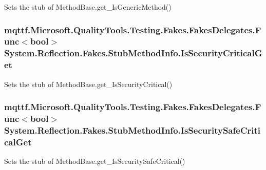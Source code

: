 Sets the stub of Method\-Base.\-get\-\_\-\-Is\-Generic\-Method()

\hypertarget{class_system_1_1_reflection_1_1_fakes_1_1_stub_method_info_ac7db65702f5bef7fe9940bda2afbfaf3}{
\subsubsection[{Is\-Security\-Critical\-Get}]{\setlength{\rightskip}{0pt plus 5cm}mqttf.\-Microsoft.\-Quality\-Tools.\-Testing.\-Fakes.\-Fakes\-Delegates.\-Func$<$bool$>$ System.\-Reflection.\-Fakes.\-Stub\-Method\-Info.\-Is\-Security\-Critical\-Get}}\label{class_system_1_1_reflection_1_1_fakes_1_1_stub_method_info_ac7db65702f5bef7fe9940bda2afbfaf3}


Sets the stub of Method\-Base.\-get\-\_\-\-Is\-Security\-Critical()

\hypertarget{class_system_1_1_reflection_1_1_fakes_1_1_stub_method_info_a46e999acc3f8932f7d95098acc0302fd}{
\subsubsection[{Is\-Security\-Safe\-Critical\-Get}]{\setlength{\rightskip}{0pt plus 5cm}mqttf.\-Microsoft.\-Quality\-Tools.\-Testing.\-Fakes.\-Fakes\-Delegates.\-Func$<$bool$>$ System.\-Reflection.\-Fakes.\-Stub\-Method\-Info.\-Is\-Security\-Safe\-Critical\-Get}}\label{class_system_1_1_reflection_1_1_fakes_1_1_stub_method_info_a46e999acc3f8932f7d95098acc0302fd}


Sets the stub of Method\-Base.\-get\-\_\-\-Is\-Security\-Safe\-Critical()

